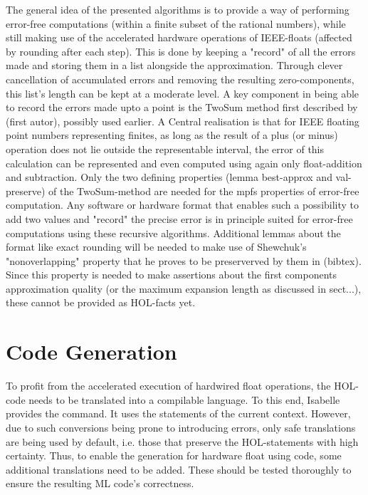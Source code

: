\documentclass[11pt,a4paper]{article}
\begin{document}
The general idea of the presented algorithms is to provide a way of performing error-free computations (within a finite subset of the rational numbers), while still making use of the accelerated hardware operations of IEEE-floats (affected by rounding after each step). This is done by keeping a "record" of all the errors made and storing them in a list alongside the approximation. Through clever cancellation of accumulated errors and removing the resulting zero-components, this list's length can be kept at a moderate level.
A key component in being able to record the errors made upto a point is the TwoSum method first described by (first autor), possibly used earlier. A Central realisation is that for IEEE floating point numbers representing finites, as long as the result of a plus (or minus) operation does not lie outside the representable interval, the error of this calculation can be represented and even computed using again only float-addition and subtraction.
Only the two defining properties (lemma best-approx and val-preserve) of the TwoSum-method are needed for the mpfs properties of error-free computation. Any software or hardware format that enables such a possibility to add two values and "record" the precise error is in principle suited for error-free computations using these recursive algorithms. Additional lemmas about the format like exact rounding will be needed to make use of Shewchuk's "nonoverlapping" property that he proves to be preserverved by them in (bibtex). Since this property is needed to make assertions about the first components approximation quality (or the maximum expansion length as discussed in sect...), these cannot be provided as HOL-facts yet.

\section{Code Generation}
To profit from the accelerated execution of hardwired float operations, the HOL-code needs to be translated into a compilable language. To this end, Isabelle provides the
command. It uses the 
statements of the current context. However, due to such conversions being prone to introducing errors, only safe translations are being used by default, i.e. those that preserve the HOL-statements with high certainty. Thus, to enable the generation for hardware float using code, some additional translations need to be added. These should be tested thoroughly to ensure the resulting ML code's correctness.
\end{document}
